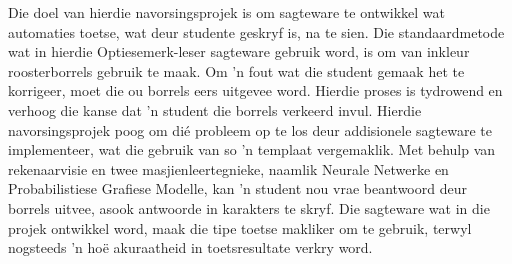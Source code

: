 
\begin{uittreksel}    %
Die doel van hierdie navorsingsprojek is om sagteware te ontwikkel wat automaties toetse, wat deur studente geskryf is, na te sien. Die standaardmetode wat in hierdie Optiesemerk-leser sagteware gebruik word, is om van inkleur roosterborrels gebruik te maak. Om 'n fout wat die student gemaak het te korrigeer, moet die ou borrels eers uitgevee word. Hierdie proses is tydrowend en verhoog die kanse dat 'n student die borrels verkeerd invul. Hierdie navorsingsprojek poog om di\'e probleem op te los deur addisionele sagteware te implementeer, wat die gebruik van so 'n templaat vergemaklik. Met behulp van rekenaarvisie en twee masjienleertegnieke, naamlik Neurale Netwerke en Probabilistiese Grafiese Modelle, kan 'n student nou vrae beantwoord deur borrels uitvee, asook antwoorde in karakters te skryf.  Die sagteware wat in die projek ontwikkel word, maak die tipe toetse makliker om te gebruik, terwyl nogsteeds 'n ho\"e akuraatheid in toetsresultate verkry word.
\end{uittreksel}